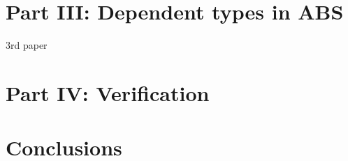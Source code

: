 \documentclass[oneside]{book}
\begin{document}
\chapter{Part III: Dependent types in ABS}
3rd paper

\chapter{Part IV: Verification}

\chapter{Conclusions}



\end{document}
